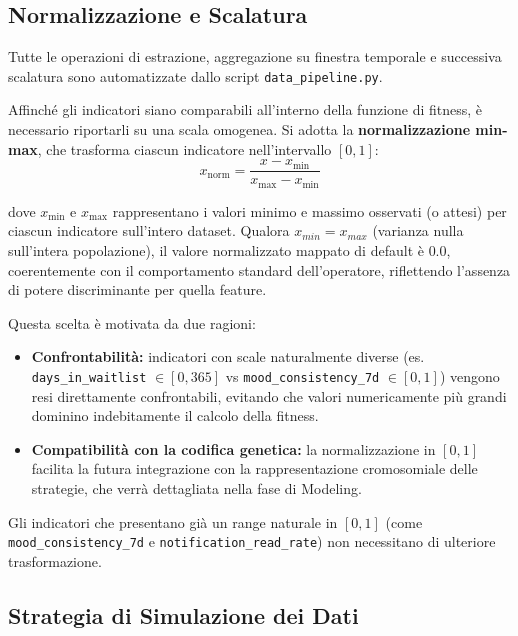 \subsection{Normalizzazione e Scalatura}
\label{subsec:normalizzazione_churn}

Tutte le operazioni di estrazione, aggregazione su finestra temporale e successiva scalatura sono automatizzate dallo script \texttt{data\_pipeline.py}. 

Affinché gli indicatori siano comparabili all'interno della funzione di fitness, è necessario riportarli su una scala omogenea. Si adotta la \textbf{normalizzazione min-max}, che trasforma ciascun indicatore nell'intervallo $[0, 1]$:
\begin{equation*}
    x_{\text{norm}} = \frac{x - x_{\min}}{x_{\max} - x_{\min}}
\end{equation*}

dove $x_{\min}$ e $x_{\max}$ rappresentano i valori minimo e massimo osservati (o attesi) per ciascun indicatore sull'intero dataset. Qualora $x_{min} = x_{max}$ (varianza nulla sull'intera popolazione), il valore normalizzato mappato di default è $0.0$, coerentemente con il comportamento standard dell'operatore, riflettendo l'assenza di potere discriminante per quella feature.

Questa scelta è motivata da due ragioni:
\begin{itemize}
    \item \textbf{Confrontabilità:} indicatori con scale naturalmente diverse (es. \texttt{days\_in\_waitlist} $\in [0, 365]$ vs \texttt{mood\_consistency\_7d} $\in [0, 1]$) vengono resi direttamente confrontabili, evitando che valori numericamente più grandi dominino indebitamente il calcolo della fitness.
    \item \textbf{Compatibilità con la codifica genetica:} la normalizzazione in $[0, 1]$ facilita la futura integrazione con la rappresentazione cromosomiale delle strategie, che verrà dettagliata nella fase di Modeling.
\end{itemize}

Gli indicatori che presentano già un range naturale in $[0, 1]$ (come \texttt{mood\_consistency\_7d} e \texttt{notification\_read\_rate}) non necessitano di ulteriore trasformazione.

\subsection{Strategia di Simulazione dei Dati}
\label{subsec:simulazione_churn}

